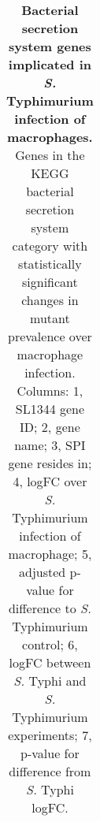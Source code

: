 %
\begin{table}
   \centering
   \noindent
    \caption[Bacterial secretion system genes implicated in {\it S.} Typhimurium infection of macrophages]{\textbf{Bacterial secretion system genes implicated in {\it S.} Typhimurium infection of macrophages.} Genes in the KEGG bacterial secretion system category with statistically significant changes in mutant prevalence over macrophage infection. Columns: 1, SL1344 gene ID; 2, gene name; 3, SPI gene resides in; 4, logFC over {\it S.} Typhimurium infection of macrophage; 5, adjusted p-value for difference to {\it S.} Typhimurium control; 6, logFC between {\it S.} Typhi and {\it S.} Typhimurium experiments; 7, p-value for difference from {\it S.} Typhi logFC. }
    \begin{tabular}{ l
    				l
				l
    				r
				c
				r
				c
				}
   

\end{tabular}
\end{table}
